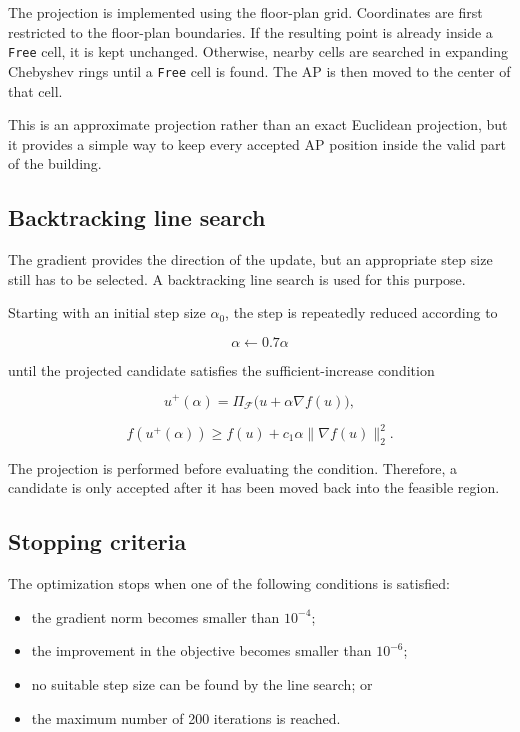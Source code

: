 \documentclass[11pt]{article}
\begin{document}
The projection is implemented using the floor-plan grid. Coordinates
are first restricted to the floor-plan boundaries. If the resulting
point is already inside a \texttt{Free} cell, it is kept unchanged.
Otherwise, nearby cells are searched in expanding Chebyshev rings until
a \texttt{Free} cell is found. The AP is then moved to the center of
that cell.

This is an approximate projection rather than an exact Euclidean
projection, but it provides a simple way to keep every accepted AP
position inside the valid part of the building.

\subsection{Backtracking line search}

The gradient provides the direction of the update, but an appropriate
step size still has to be selected. A backtracking line search is used
for this purpose.

Starting with an initial step size $\alpha_0$, the step is repeatedly
reduced according to

\[
\alpha\leftarrow0.7\alpha
\]

until the projected candidate satisfies the sufficient-increase
condition

\[
u^+(\alpha)=
\Pi_{\mathcal{F}}
\big(u+\alpha\nabla f(u)\big),
\]

\[
f(u^+(\alpha))
\geq
f(u)+c_1\alpha\lVert\nabla f(u)\rVert_2^2.
\]

The projection is performed before evaluating the condition. Therefore,
a candidate is only accepted after it has been moved back into the
feasible region.

\subsection{Stopping criteria}

The optimization stops when one of the following conditions is
satisfied:

\begin{itemize}
    \item the gradient norm becomes smaller than $10^{-4}$;
    \item the improvement in the objective becomes smaller than
    $10^{-6}$;
    \item no suitable step size can be found by the line search; or
    \item the maximum number of 200 iterations is reached.
\end{itemize}
\end{document}
